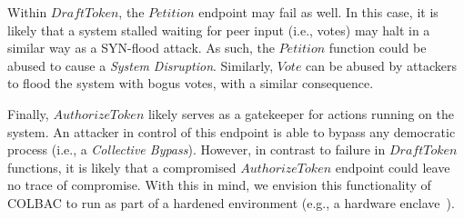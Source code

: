 Within $DraftToken$, the $Petition$ endpoint may fail as well. In this case, it
is likely that a system stalled waiting for peer input (i.e., votes) may halt
in a similar way as a SYN-flood attack. As such, the $Petition$ function could
be abused to cause a \emph{System Disruption}. Similarly, $Vote$ can be abused
by attackers to flood the system with bogus votes, with a similar consequence.
        
Finally, $AuthorizeToken$ likely serves as a gatekeeper for actions running on
the system. An attacker in control of this endpoint is able to bypass any
democratic process (i.e., a \emph{Collective Bypass}). However, in contrast to
failure in $DraftToken$ functions, it is likely that a compromised
$AuthorizeToken$ endpoint could leave no trace of compromise. With this in
mind, we envision this functionality of COLBAC to run as part of a hardened
environment (e.g., a hardware enclave~\cite{sgx}).